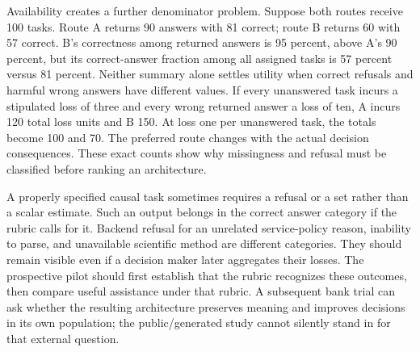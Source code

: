 Availability creates a further denominator problem. Suppose both routes
receive 100 tasks. Route A returns 90 answers with 81 correct; route B
returns 60 with 57 correct. B's correctness among returned answers is
95 percent, above A's 90 percent, but its correct-answer fraction among
all assigned tasks is 57 percent versus 81 percent. Neither summary
alone settles utility when correct refusals and harmful wrong answers
have different values. If every unanswered task incurs a stipulated
loss of three and every wrong returned answer a loss of ten, A incurs
120 total loss units and B 150. At loss one per unanswered task, the
totals become 100 and 70. The preferred route changes with the actual
decision consequences. These exact counts show why missingness and
refusal must be classified before ranking an architecture.

A properly specified causal task sometimes requires a refusal or a set
rather than a scalar estimate. Such an output belongs in the correct
answer category if the rubric calls for it. Backend refusal for an
unrelated service-policy reason, inability to parse, and unavailable
scientific method are different categories. They should remain visible
even if a decision maker later aggregates their losses. The prospective
pilot should first establish that the rubric recognizes these outcomes,
then compare useful assistance under that rubric. A subsequent bank
trial can ask whether the resulting architecture preserves meaning and
improves decisions in its own population; the public/generated study
cannot silently stand in for that external question.
\citep{exec14_l6_adapter_exact}

\label{exec14:l6-adapter-end}
